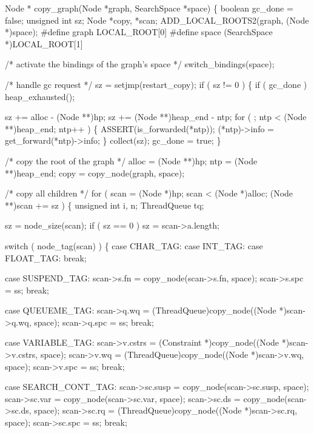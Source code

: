 \nwenddocs{}\plusendmoddef\nwstartdeflinemarkup{}\nwenddeflinemarkup
Node *
copy_graph(Node *graph, SearchSpace *space)
\{
    boolean      gc_done = false;
    unsigned int sz;
    Node         *copy, *scan;
    ADD_LOCAL_ROOTS2(graph, (Node *)space);
#define graph LOCAL_ROOT[0]
#define space (SearchSpace *)LOCAL_ROOT[1]

    /* activate the bindings of the graph's space */
    switch_bindings(space);

    /* handle gc request */
    sz = setjmp(restart_copy);
    if ( sz != 0 )
    \{
        if ( gc_done )
            heap_exhausted();

        sz += alloc - (Node **)hp;
        sz += (Node **)heap_end - ntp;
        for ( ; ntp < (Node **)heap_end; ntp++ )
        \{
            ASSERT(is_forwarded(*ntp));
            (*ntp)->info = get_forward(*ntp)->info;
        \}
        collect(sz);
        gc_done = true;
    \}

    /* copy the root of the graph */
    alloc = (Node **)hp;
    ntp   = (Node **)heap_end;
    copy  = copy_node(graph, space);

    /* copy all children */
    for ( scan = (Node *)hp; scan < (Node *)alloc; (Node **)scan += sz )
    \{
        unsigned int i, n;
        ThreadQueue  tq;

        sz = node_size(scan);
        if ( sz == 0 )
            sz = scan->a.length;

        switch ( node_tag(scan) )
        \{
        case CHAR_TAG:
        case INT_TAG:
        case FLOAT_TAG:
            break;

        case SUSPEND_TAG:
            scan->s.fn  = copy_node(scan->s.fn, space);
            scan->s.spc = ss;
            break;

        case QUEUEME_TAG:
            scan->q.wq  = (ThreadQueue)copy_node((Node *)scan->q.wq, space);
            scan->q.spc = ss;
            break;

        case VARIABLE_TAG:
            scan->v.cstrs = (Constraint *)copy_node((Node *)scan->v.cstrs, space);
            scan->v.wq    = (ThreadQueue)copy_node((Node *)scan->v.wq, space);
            scan->v.spc   = ss;
            break;

        case SEARCH_CONT_TAG:
            scan->sc.susp = copy_node(scan->sc.susp, space);
            scan->sc.var  = copy_node(scan->sc.var, space);
            scan->sc.ds   = copy_node(scan->sc.ds, space);
            scan->sc.rq   = (ThreadQueue)copy_node((Node *)scan->sc.rq, space);
            scan->sc.spc  = ss;
            break;

